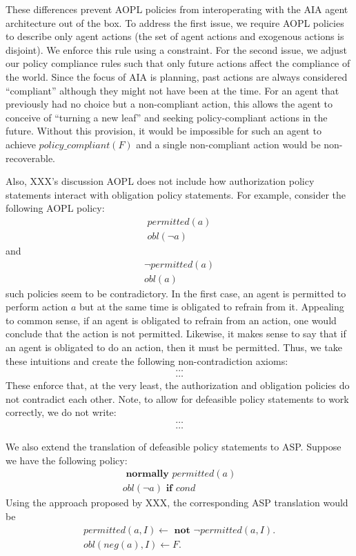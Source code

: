 These differences prevent AOPL policies from interoperating with the AIA agent architecture out of the box.
To address the first issue, we require AOPL policies to describe only agent actions (the set of agent actions and exogenous actions is disjoint).
We enforce this rule using a constraint.
For the second issue, we adjust our policy compliance rules such that only future actions affect the compliance of the world.
Since the focus of AIA is planning, past actions are always considered ``compliant'' although they might not have been at the time.
For an agent that previously had no choice but a non-compliant action, this allows the agent to conceive of ``turning a new leaf'' and seeking policy-compliant actions in the future.
Without this provision, it would be impossible for such an agent to achieve $policy\_compliant(F)$ and a single non-compliant action would be non-recoverable.

Also, XXX's discussion AOPL does not include how authorization policy statements interact with obligation policy statements.
For example, consider the following AOPL policy:
\begin{gather}
    permitted(a) \\
    obl(\neg a)
\end{gather}
and
\begin{gather}
    \neg permitted(a) \\
    obl(a)
\end{gather}
such policies seem to be contradictory.
In the first case, an agent is permitted to perform action $a$ but at the same time is obligated to refrain from it.
Appealing to common sense, if an agent is obligated to refrain from an action, one would conclude that the action is not permitted.
Likewise, it makes sense to say that if an agent is obligated to do an action, then it must be permitted.
Thus, we take these intuitions and create the following non-contradiction axioms:
\begin{gather}
    \dots \\
    \dots
\end{gather}
These enforce that, at the very least, the authorization and obligation policies do not contradict each other.
Note, to allow for defeasible policy statements to work correctly, we do not write:
\begin{gather}
    \dots \\
    \dots
\end{gather}

We also extend the translation of defeasible policy statements to ASP.
Suppose we have the following policy:
\begin{gather}
    \textbf{ normally } permitted(a) \\
    obl(\neg a) \textbf{ if } cond
\end{gather}
Using the approach proposed by XXX, the corresponding ASP translation would be
\begin{gather}
    permitted(a, I) \leftarrow \textbf{ not } \neg permitted(a, I). \\
    obl(neg(a), I) \leftarrow F.
\end{gather}

